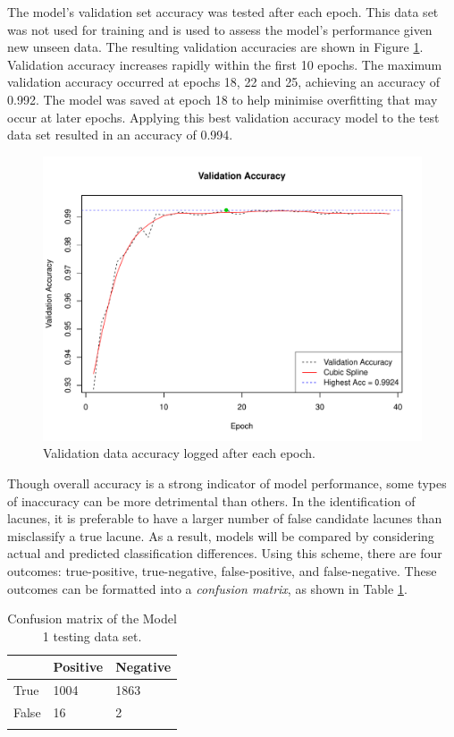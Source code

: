 The model's validation set accuracy was tested after each epoch. This data set was not used for training and is used to assess the model's performance given new unseen data. The resulting validation accuracies are shown in Figure \ref{results-valid-acc4-fig}. Validation accuracy increases rapidly within the first 10 epochs. The maximum validation accuracy occurred at epochs 18, 22 and 25, achieving an accuracy of 0.992. The model was saved at epoch 18 to help minimise overfitting that may occur at later epochs. Applying this best validation accuracy model to the test data set resulted in an accuracy of 0.994.

\begin{figure}[hb]
	\centering
	\includegraphics[width=\textwidth]{Images/7_valid_acc4.pdf}
	\caption{Validation data accuracy logged after each epoch.}
	\label{results-valid-acc4-fig}
\end{figure}

Though overall accuracy is a strong indicator of model performance, some types of inaccuracy can be more detrimental than others. In the identification of lacunes, it is preferable to have a larger number of false candidate lacunes than misclassify a true lacune. As a result, models will be compared by considering actual and predicted classification differences. Using this scheme, there are four outcomes: true-positive, true-negative, false-positive, and false-negative. These outcomes can be formatted into a \textit{confusion matrix}, as shown in Table \ref{results-confmat4-tab}.

\begin{table}[ht]
	\centering
	\begin{tabular}{@{}lll@{}}
	\toprule[1.5pt]
	& Positive & Negative\\
	\midrule
	True & 1004 & 1863\\
	False & 16 & 2\\
	\bottomrule[1.5pt]\\
	\end{tabular}
	\caption{Confusion matrix of the Model 1 testing data set.}
	\label{results-confmat4-tab}
\end{table}

